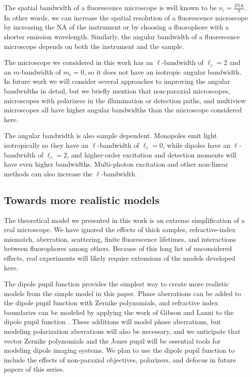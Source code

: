 \documentclass[]{osa-article}
\begin{document}
The spatial bandwidth of a fluorescence microscope is well known to be
$\nu_c = \frac{2\text{NA}}{\lambda}$. In other words, we can increase the
spatial resolution of a fluorescence microscope by increasing the NA of the
instrument or by choosing a fluorophore with a shorter emission wavelength.
Similarly, the angular bandwidth of a fluorescence microscope depends on both
the instrument and the sample.

The microscope we considered in this work has an $\ell$-bandwidth of
$\ell_c = 2$ and an $m$-bandwidth of $m_c = 0$, so it does not have an isotropic
angular bandwidth. In future work we will consider several approaches to
improving the angular bandwidths in detail, but we briefly mention that
non-paraxial microscopes, microscopes with polarizers in the illumination or
detection paths, and multiview microscopes all have higher angular bandwidths
than the microscope considered here.

The angular bandwidth is also sample dependent. Monopoles emit light
isotropically so they have an $\ell$-bandwidth of $\ell_c = 0$, while dipoles
have an $\ell$-bandwidth of $\ell_c = 2$, and higher-order excitation and
detection moments will have even higher bandwidths. Multi-photon excitation and
other non-linear methods can also increase the $\ell$-bandwidth
\cite{brasselet2011}.

\subsection{Towards more realistic models}
The theoretical model we presented in this work is an extreme simplification of
a real microscope. We have ignored the effects of thick samples,
refractive-index mismatch, aberration, scattering, finite fluorescence
lifetimes, and interactions between fluorophores among others. Because of this
long list of unconsidered effects, real experiments will likely require
extensions of the models developed here.

The dipole pupil function provides the simplest way to create more realistic
models from the simple model in this paper. Phase aberrations can be added to
the dipole pupil function with Zernike polynomials, and refractive index
boundaries can be modeled by applying the work of Gibson and Lanni to the dipole
pupil function \cite{gibson89}. These additions will model phase aberrations,
but modeling polarization aberrations will also be necessary, and we anticipate
that vector Zernike polynomials and the Jones pupil \cite{zhao2007, xu2015,
  chipman1989} will be essential tools for modeling dipole imaging systems. We
plan to use the dipole pupil function to include the effects of non-paraxial
objectives, polarizers, and defocus in future papers of this series.
\end{document}
